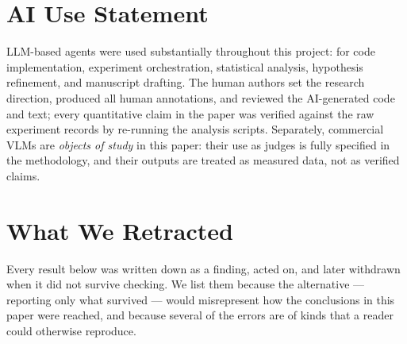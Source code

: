 \documentclass{article}
\begin{document}
\section*{AI Use Statement}
LLM-based agents were used substantially throughout this project: for code
implementation, experiment orchestration, statistical analysis, hypothesis
refinement, and manuscript drafting. The human authors set the research
direction, produced all human annotations, and reviewed the AI-generated
code and text; every quantitative claim in the paper was verified against
the raw experiment records by re-running the analysis scripts. Separately, commercial VLMs are \emph{objects of
study} in this paper: their use as judges is fully specified in the
methodology, and their outputs are treated as measured data, not as
verified claims.

\label{endofmain}




\appendix
\label{startapp}

\section{What We Retracted}
\label{app:retractions}

Every result below was written down as a finding, acted on, and later
withdrawn when it did not survive checking. We list them because the
alternative --- reporting only what survived --- would misrepresent how the
conclusions in this paper were reached, and because several of the errors are
of kinds that a reader could otherwise reproduce.
\end{document}

